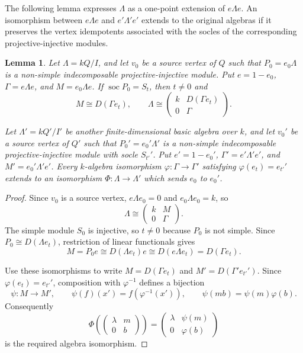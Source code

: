 \documentclass[11pt]{article}
\newcommand{\soc}{\operatorname{soc}}
\providecommand{\varLambda}{\Lambda}
\providecommand{\varGamma}{\Gamma}
\newtheorem{lemma}[theorem]{Lemma}
\theoremstyle{definition}
\begin{document}
		The following lemma expresses $\varLambda$ as a one-point extension of $e\varLambda e$.
		An isomorphism between $e\varLambda e$ and $e'\varLambda'e'$ extends to the original algebras if it preserves the vertex idempotents associated with the socles of the corresponding projective-injective modules.

		\begin{lemma}\label{lemma of isomorphisms of one-point extensions}
			Let $\varLambda=kQ/I$, and let $v_0$ be a source vertex of $Q$ such that $P_0=e_0\varLambda$ is a non-simple indecomposable projective-injective module.
			Put $e=1-e_0$, $\varGamma=e\varLambda e$, and $M=e_0\varLambda e$.
			If $\soc P_0=S_t$, then $t\ne0$ and
			\[
				M\cong D(\varGamma e_t),\qquad
				\varLambda\cong\begin{pmatrix}k&D(\varGamma e_t)\\0&\varGamma\end{pmatrix}.
			\]

			Let $\varLambda'=kQ'/I'$ be another finite-dimensional basic algebra over $k$, and let $v_0'$ be a source vertex of $Q'$ such that $P_0'=e_0'\varLambda'$ is a non-simple indecomposable projective-injective module with socle $S_{t'}'$.
			Put $e'=1-e_0'$, $\varGamma'=e'\varLambda'e'$, and $M'=e_0'\varLambda'e'$.
			Every $k$-algebra isomorphism $\varphi:\varGamma\to \varGamma'$ satisfying $\varphi(e_t)=e_{t'}'$ extends to an isomorphism $\varPhi:\varLambda\to \varLambda'$ which sends $e_0$ to $e_0'$.
		\end{lemma}

		\begin{proof}
			Since $v_0$ is a source vertex, $e\varLambda e_0=0$ and $e_0\varLambda e_0=k$, so
			\[ 
				\varLambda\cong\begin{pmatrix}k&M\\0&\varGamma\end{pmatrix}. 
			\]
			The simple module $S_0$ is injective, so $t\ne0$ because $P_0$ is not simple.
			Since $P_0\cong D(\varLambda e_t)$, restriction of linear functionals gives
			\[
				M=P_0e\cong D(\varLambda e_t)e\cong D(e\varLambda e_t)=D(\varGamma e_t).
			\]

			Use these isomorphisms to write $M=D(\varGamma e_t)$ and $M'=D(\varGamma'e_{t'}')$.
			Since $\varphi(e_t)=e_{t'}'$, composition with $\varphi^{-1}$ defines a bijection
			\[
				\psi:M\to M',\qquad
				\psi(f)(x')=f(\varphi^{-1}(x')),
				\qquad \psi(mb)=\psi(m)\varphi(b).
			\]
			Consequently
			\[
				\varPhi\left(\begin{pmatrix}\lambda&m\\0&b\end{pmatrix}\right)
				=\begin{pmatrix}\lambda&\psi(m)\\0&\varphi(b)\end{pmatrix}
			\]
			is the required algebra isomorphism.
		\end{proof}
\end{document}
